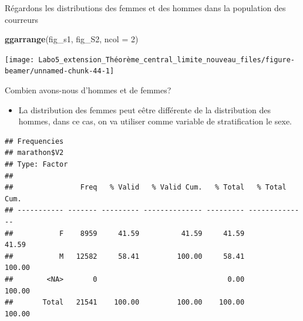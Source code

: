 \documentclass[ignorenonframetext,]{beamer}
\newenvironment{Shaded}{\begin{snugshade}}{\end{snugshade}}
\newcommand{\KeywordTok}[1]{\textcolor[rgb]{0.13,0.29,0.53}{\textbf{#1}}}
\newcommand{\DataTypeTok}[1]{\textcolor[rgb]{0.13,0.29,0.53}{#1}}
\newcommand{\DecValTok}[1]{\textcolor[rgb]{0.00,0.00,0.81}{#1}}
\newcommand{\CommentTok}[1]{\textcolor[rgb]{0.56,0.35,0.01}{\textit{#1}}}
\newcommand{\OperatorTok}[1]{\textcolor[rgb]{0.81,0.36,0.00}{\textbf{#1}}}
\newcommand{\NormalTok}[1]{#1}
\providecommand{\tightlist}{%
  \setlength{\itemsep}{0pt}\setlength{\parskip}{0pt}}
\begin{document}
\begin{frame}[fragile]{Régardons les distributions des femmes et des
hommes dans la population des courreurs}

\begin{Shaded}
\begin{Highlighting}[]
\KeywordTok{ggarrange}\NormalTok{(fig_s1, fig_S2, }\DataTypeTok{ncol =} \DecValTok{2}\NormalTok{)}
\end{Highlighting}
\end{Shaded}

\texttt{[image: Labo5\_extension\_Théorème\_central\_limite\_nouveau\_files/figure-beamer/unnamed-chunk-44-1]}

\end{frame}

\begin{frame}[fragile]{Combien avons-nous d'hommes et de femmes?}

\begin{itemize}
\tightlist
\item
  La distribution des femmes peut eêtre différente de la distribution
  des hommes, dans ce cas, on va utiliser comme variable de
  stratification le sexe.
\end{itemize}

\begin{Shaded}
\end{Shaded}

\begin{verbatim}
## Frequencies  
## marathon$V2  
## Type: Factor  
## 
##                Freq   % Valid   % Valid Cum.   % Total   % Total Cum.
## ----------- ------- --------- -------------- --------- --------------
##           F    8959     41.59          41.59     41.59          41.59
##           M   12582     58.41         100.00     58.41         100.00
##        <NA>       0                               0.00         100.00
##       Total   21541    100.00         100.00    100.00         100.00
\end{verbatim}

\begin{Shaded}
\end{Shaded}

\end{frame}
\end{document}
